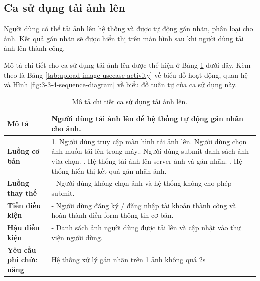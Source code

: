 \subsection{Ca sử dụng tải ảnh lên}

Người dùng có thể tải ảnh lên hệ thống và được tự động gán nhãn, phân loại cho ảnh. Kết quả gán nhãn sẽ được hiển thị trên màn hình sau khi người dùng tải ảnh lên thành công.

Mô tả chi tiết cho ca sử dụng tải ảnh lên được thể hiện ở Bảng \ref{tab:upload-image-usecase} dưới đây. Kèm theo là Bảng \ref{tab:upload-image-usecase-activity} về biểu đồ hoạt động, quan hệ và Hình \ref{fig:3-3-4-sequence-diagram} về biểu đồ tuần tự của ca sử dụng này. 

\noindent 

\begin{table}[H]
\centering
\begin{tabularx}{\linewidth}{| l | X |} 
\hline 
\textbf{Mô tả} & Người dùng tải ảnh lên để hệ thống tự động gán nhãn cho ảnh. \\
\hline 
\textbf{Luồng cơ bản} & 1. Người dùng truy cập màn hình tải ảnh lên\newline
                       2. Người dùng chọn ảnh muốn tải lên trong máy.\newline
                       3. Người dùng submit danh sách ảnh vừa chọn. \newline
                       4. Hệ thống tải ảnh lên server ảnh và gán nhãn. \newline
                       5. Hệ thống hiển thị kết quả gán nhãn ảnh. \\
\hline 
\textbf{Luồng thay thế} &
                       - Người dùng không chọn ảnh và hệ thống không cho phép submit. \\ 
\hline 
\textbf{Tiền điều kiện} & - Người dùng đăng ký / đăng nhập tài khoản thành công và hoàn thành điền form thông tin cơ bản. \\
\hline 
\textbf{Hậu điều kiện} & - Danh sách ảnh người dùng được tải lên và cập nhật vào thư viện người dùng. \\
\hline 
\textbf{Yêu cầu phi chức năng} & Hệ thống xử lý gán nhãn trên 1 ảnh không quá 2s \\
\hline 
\end{tabularx}
\caption{Mô tả chi tiết ca sử dụng tải ảnh lên.}
\label{tab:upload-image-usecase}
\end{table}

\vspace{0.8cm}

